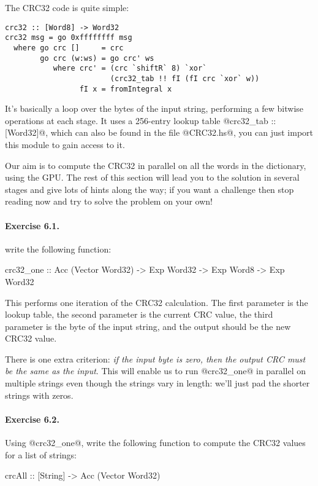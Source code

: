 \documentclass[11pt,a4paper]{article}
\begin{document}
The CRC32 code is quite simple:

{\small \begin{verbatim}
crc32 :: [Word8] -> Word32
crc32 msg = go 0xffffffff msg
  where go crc []     = crc
        go crc (w:ws) = go crc' ws
           where crc' = (crc `shiftR` 8) `xor`
                        (crc32_tab !! fI (fI crc `xor` w))
                 fI x = fromIntegral x
\end{verbatim}}

It's basically a loop over the bytes of the input string, performing a
few bitwise operations at each stage.  It uses a 256-entry lookup
table @crc32_tab :: [Word32]@, which can also be found in the file
@CRC32.hs@, you can just import this module to gain access to it.

Our aim is to compute the CRC32 in parallel on all the words in the
dictionary, using the GPU.  The rest of this section will lead you to
the solution in several stages and give lots of hints along the way;
if you want a challenge then stop reading now and try to solve the
problem on your own!

\paragraph{Exercise 6.1.} write the following function:

\begin{haskell}
crc32_one :: Acc (Vector Word32) -> Exp Word32 -> Exp Word8
          -> Exp Word32
\end{haskell}

\noindent This performs one iteration of the CRC32 calculation.  The
first parameter is the lookup table, the second parameter is the
current CRC value, the third parameter is the byte of the input
string, and the output should be the new CRC32 value.

There is one extra criterion: \emph{if the input byte is zero, then
  the output CRC must be the same as the input}.  This will enable us
to run @crc32_one@ in parallel on multiple strings even though the
strings vary in length: we'll just pad the shorter strings with zeros.

\paragraph{Exercise 6.2.} Using @crc32_one@, write the following
function to compute the CRC32 values for a list of strings:

\begin{haskell}
crcAll :: [String] -> Acc (Vector Word32)
\end{haskell}
\end{document}
